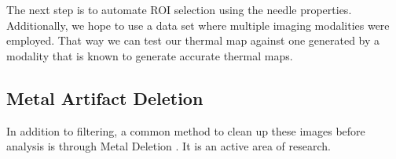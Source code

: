 \documentclass[]{spie}  %
\begin{document}
The next step is to automate ROI selection using the needle properties. Additionally, we hope to use a data set where multiple imaging modalities were employed. That way we can test our thermal map against one generated by a modality that is known to generate accurate thermal maps. 

\subsection{Metal Artifact Deletion}

In addition to filtering, a common method to clean up these images before analysis is through Metal Deletion \cite{Boas11}. It is an active area of research.



\end{document}
